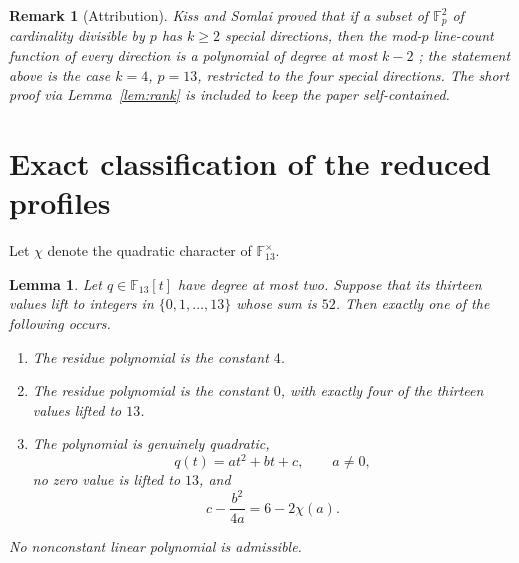 \documentclass[10pt,a4paper]{amsart}
\newtheorem{lemma}[theorem]{Lemma}
\newtheorem{remark}[theorem]{Remark}
\newcommand{\F}{\mathbb F}
\begin{document}
\begin{remark}[Attribution]\label{rem:attribution}
Kiss and Somlai proved that if a
subset of $\F_p^{2}$ of cardinality divisible by $p$ has $k\ge2$ special
directions, then the mod-$p$ line-count function of every direction is a
polynomial of degree at most $k-2$
\cite[Proposition~3.1]{KissSomlaiSpecialDirections}; the statement above is
the case $k=4$, $p=13$, restricted to the four special directions.  The
short proof via Lemma~\ref{lem:rank} is included to keep the paper
self-contained.
\end{remark}

\section{Exact classification of the reduced profiles}\label{sec:profiles}

Let $\chi$ denote the quadratic character of $\F_{13}^{\times}$.

\begin{lemma}\label{lem:profiles}
Let $q\in\F_{13}[t]$ have degree at most two.  Suppose that its thirteen
values lift to integers in $\{0,1,\ldots,13\}$ whose sum is $52$.
Then exactly one of the following occurs.
\begin{enumerate}
\item The residue polynomial is the constant $4$.
\item The residue polynomial is the constant $0$, with exactly four of the
      thirteen values lifted to $13$.
\item The polynomial is genuinely quadratic,
      \[
        q(t)=at^2+bt+c,
        \qquad a\ne0,
      \]
      no zero value is lifted to $13$, and
      \begin{equation}\label{eq:vertex-condition}
        c-\frac{b^2}{4a}=6-2\chi(a).
      \end{equation}
\end{enumerate}
No nonconstant linear polynomial is admissible.
\end{lemma}
\end{document}
